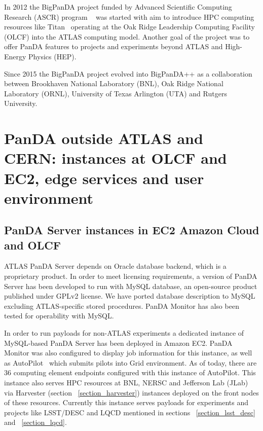 \documentclass{webofc}
\begin{document}
In 2012 the BigPanDA project funded by Advanced Scientific Computing Research (ASCR) program ~\cite{DOEASCR} was started with aim to introduce HPC computing resources like Titan~\cite{Titan} operating at the Oak Ridge Leadership Computing Facility (OLCF) into the ATLAS computing model.
Another goal of the project was to offer PanDA features to projects and experiments beyond ATLAS and High-Energy Physics (HEP).


Since 2015 the BigPanDA project evolved into  BigPanDA++ as a collaboration between Brookhaven National Laboratory (BNL), Oak Ridge National Laboratory (ORNL),  University of Texas Arlington (UTA) and Rutgers University.


\section{PanDA outside ATLAS and CERN: instances at OLCF and EC2, edge services  and user environment}

\subsection{PanDA Server instances in EC2 Amazon Cloud and OLCF}


ATLAS PanDA Server depends on Oracle database backend, which is a proprietary product. In order to meet licensing requirements, a version of PanDA Server has been developed to run with MySQL database, an open-source product published under GPLv2 license.  
We have ported database description to MySQL excluding ATLAS-specific stored procedures. PanDA Monitor has also been tested for operability with MySQL.

In order to run payloads for non-ATLAS experiments a dedicated instance of MySQL-based PanDA Server has been deployed in Amazon EC2.  
PanDA Monitor was also configured to display job information for this instance, as well as AutoPilot~\cite{PanDAPilotSubmission} which submits pilots into Grid environment. 
As of today, there are 36 computing element endpoints configured with this instance of AutoPilot. 
This instance also serves HPC resources at BNL, NERSC and Jefferson Lab (JLab) via Harvester (section ~\ref{section_harvester}) instances deployed on the front nodes of these resources. 
Currently this instance serves payloads for experiments and projects like LSST/DESC and LQCD mentioned in sections ~\ref{section_lsst_desc} and ~\ref{section_lqcd}.
\end{document}
